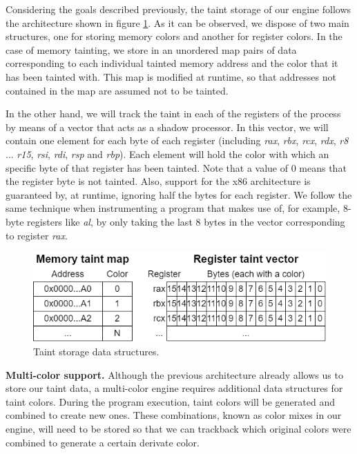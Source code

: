 \documentclass[conference]{IEEEtran}
\begin{document}
Considering the goals described previously, the taint storage of our engine
follows the architecture shown in figure \ref{figure:taintingengine}. As it can
be observed, we dispose of two main structures, one for storing memory colors
and another for register colors. In the case of memory tainting, we store in an
unordered map pairs of data corresponding to each individual tainted memory
address and the color that it has been tainted with. This map is modified at
runtime, so that addresses not contained in the map are assumed not to be
tainted.

In the other hand, we will track the taint in each of the registers of the
process by means of a vector that acts as a shadow processor. In this vector,
we will contain one element for each byte of each register (including
\textit{rax}, \textit{rbx}, \textit{rcx}, \textit{rdx}, \textit{r8} ...
\textit{r15}, \textit{rsi}, \textit{rdi}, \textit{rsp} and \textit{rbp}). Each
element will hold the color with which an specific byte of that register has
been tainted. Note that a value of 0 means that the register byte is not
tainted. Also, support for the x86 architecture is guaranteed by, at runtime,
ignoring half the bytes for each register. We follow the same technique when
instrumenting a program that makes use of, for example, 8-byte registers like
\textit{al}, by only taking the last 8 bytes in the vector corresponding to
register \textit{rax}.

\begin{figure}
    \centerline{\includegraphics[width=0.9\columnwidth]{images/TaintingEngine.drawio.png}}
    \caption{Taint storage data structures.}
    \label{figure:taintingengine}
\end{figure}

\textbf{Multi-color support.} Although the previous architecture already allows
us to store our taint data, a multi-color engine requires additional data structures
for taint colors. During the program execution, taint colors will be generated
and combined to create new ones. These combinations, known as color mixes in
our engine, will need to be stored so that we can trackback which original colors
were combined to generate a certain derivate color.
\end{document}
